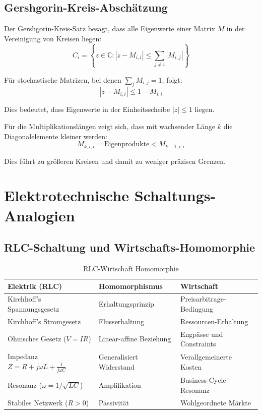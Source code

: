 \documentclass[a4paper,12pt]{article}
\theoremstyle{definition}
\begin{document}
\subsection{Gershgorin-Kreis-Abschätzung}

Der Gershgorin-Kreis-Satz besagt, dass alle Eigenwerte einer Matrix $M$ in der Vereinigung von Kreisen liegen:
\[
C_i = \left\{ z \in \mathbb{C} : |z - M_{i,i}| \leq \sum_{j \neq i} |M_{i,j}| \right\}
\]

Für stochastische Matrizen, bei denen $\sum_j M_{i,j} = 1$, folgt:
\[
|z - M_{i,i}| \leq 1 - M_{i,i}
\]

Dies bedeutet, dass Eigenwerte in der Einheitsscheibe $|z| \leq 1$ liegen.

Für die Multiplikationslängen zeigt sich, dass mit wachsender Länge $k$ die Diagonalelemente kleiner werden:
\[
M_{k,i,i} = \text{Eigenprodukte} < M_{k-1,i,i}
\]

Dies führt zu größeren Kreisen und damit zu weniger präzisen Grenzen.

\section{Elektrotechnische Schaltungs-Analogien}

\subsection{RLC-Schaltung und Wirtschafts-Homomorphie}

\begin{table}[h]
\centering
\renewcommand{\arraystretch}{1.3}
\begin{tabular}{|l|l|l|}
\hline
\textbf{Elektrik (RLC)} & \textbf{Homomorphismus} & \textbf{Wirtschaft} \\
\hline
Kirchhoff's Spannungsgesetz & Erhaltungsprinzip & Preisarbitrage-Bedingung \\
Kirchhoff's Stromgesetz & Flusserhaltung & Ressourcen-Erhaltung \\
Ohmsches Gesetz ($V = IR$) & Linear-affine Beziehung & Engpässe und Constraints \\
Impedanz $Z = R + j\omega L + \frac{1}{j\omega C}$ & Generalisiert Widerstand & Verallgemeinerte Kosten \\
Resonanz ($\omega = 1/\sqrt{LC}$) & Amplifikation & Business-Cycle Resonanz \\
Stabiles Netzwerk ($R > 0$) & Passivität & Wohlgeordnete Märkte \\
\hline
\end{tabular}
\caption{RLC-Wirtschaft Homomorphie}
\label{tab:rlc_homomorphie}
\end{table}
\end{document}
